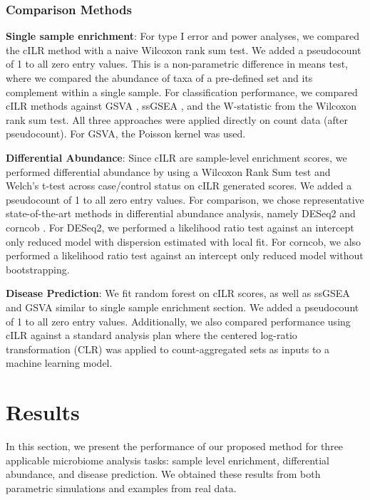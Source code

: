 \documentclass[10pt,letterpaper]{article}
\begin{document}
\subsubsection*{Comparison Methods}

\noindent \textbf{Single sample enrichment}: For type I error and power analyses, we compared the cILR method with a naive Wilcoxon rank sum test. We added a pseudocount of 1 to all zero entry values. This is a non-parametric difference in means test, where we compared the abundance of taxa of a pre-defined set and its complement within a single sample. For classification performance, we compared cILR methods against GSVA \cite{hanzelmann2013}, ssGSEA \cite{barbie2009}, and the W-statistic from the Wilcoxon rank sum test. All three approaches were applied directly on count data (after pseudocount). For GSVA, the Poisson kernel was used. 

\noindent \textbf{Differential Abundance}: Since cILR are sample-level enrichment scores, we performed differential abundance by using a Wilcoxon Rank Sum test and Welch's t-test across case/control status on cILR generated scores. We added a pseudocount of 1 to all zero entry values. For comparison, we chose representative state-of-the-art methods in differential abundance analysis, namely DESeq2 \cite{love2014,mcmurdie2014} and corncob \cite{martin2020}. For DESeq2, we performed a likelihood ratio test against an intercept only reduced model with dispersion estimated with local fit. For corncob, we also performed a likelihood ratio test against an intercept only reduced model without bootstrapping. 

\noindent \textbf{Disease Prediction}: We fit random forest on cILR scores, as well as ssGSEA \cite{hanzelmann2013} and GSVA \cite{barbie2009} similar to single sample enrichment section. We added a pseudocount of 1 to all zero entry values. Additionally, we also compared performance using cILR against a standard analysis plan where the centered log-ratio transformation (CLR) was applied to count-aggregated sets as inputs to a machine learning model. 

\section*{Results}
In this section, we present the performance of our proposed method for three applicable microbiome analysis tasks: sample level enrichment, differential abundance, and disease prediction. We obtained these results from both parametric simulations and examples from real data.  
\end{document}
